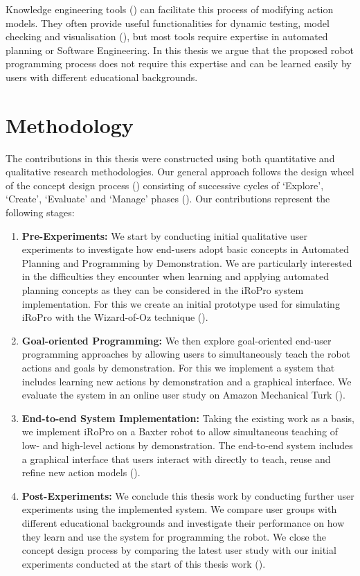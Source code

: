 Knowledge engineering tools () can facilitate this process of modifying action models.
They often provide useful functionalities for dynamic testing, model checking and visualisation (\cite{simpson2007planning}), but most tools require expertise in automated planning or Software Engineering.
In this thesis we argue that the proposed robot programming process does not require this expertise and can be learned easily by users with different educational backgrounds.


\section{Methodology}\label{sec:methodology}
The contributions in this thesis were constructed using both quantitative and qualitative research methodologies.
Our general approach follows the design wheel of the concept design process (\cite{designwheel}) consisting of successive cycles of `Explore', `Create', `Evaluate' and `Manage' phases ().
Our contributions represent the following stages:
\begin{enumerate}
	\item {\textbf{Pre-Experiments: }We start by conducting initial qualitative user experiments to investigate how end-users adopt basic concepts in Automated Planning and Programming by Demonstration.
	We are particularly interested in the difficulties they encounter when learning and applying automated planning concepts as they can be considered in the iRoPro system implementation.
	For this we create an initial prototype used for simulating iRoPro with the Wizard-of-Oz technique ().
	}
	\item {\textbf{Goal-oriented Programming: }We then explore goal-oriented end-user programming approaches by allowing users to simultaneously teach the robot actions and goals by demonstration.
	For this we implement a system that includes learning new actions by demonstration and a graphical interface. We evaluate the system in an online user study on Amazon Mechanical Turk ().}
	\item {\textbf{End-to-end System Implementation:} Taking the existing work as a basis, we implement iRoPro on a Baxter robot to allow simultaneous teaching of low- and high-level actions by demonstration.
	The end-to-end system includes a graphical interface that users interact with directly to teach, reuse and refine new action models ().}
	\item {\textbf{Post-Experiments: } We conclude this thesis work by conducting further user experiments using the implemented system.
		We compare user groups with different educational backgrounds and investigate their performance on how they learn and use the system for programming the robot.
		We close the concept design process by comparing the latest user study with our initial experiments conducted at the start of this thesis work ().}
\end{enumerate}


